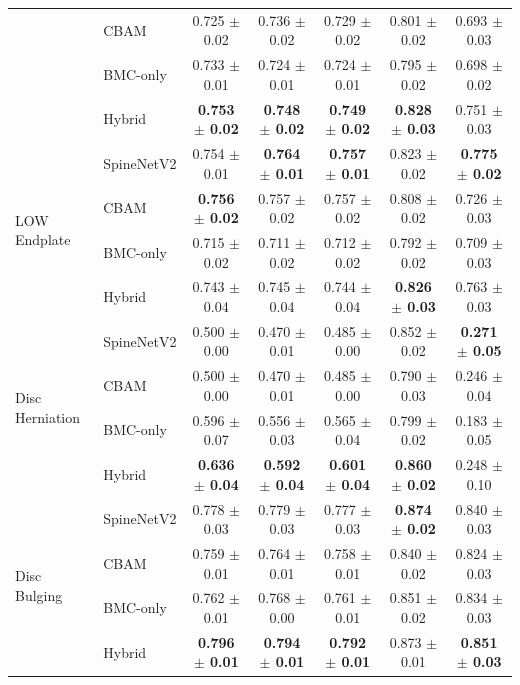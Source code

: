 \begin{table}[htbp]
{\begin{tabular}{llccccc}
 & CBAM     & 0.725 $\pm$ 0.02 & 0.736 $\pm$ 0.02 & 0.729 $\pm$ 0.02 & 0.801 $\pm$ 0.02 & 0.693 $\pm$ 0.03 \\
 & BMC-only & 0.733 $\pm$ 0.01 & 0.724 $\pm$ 0.01 & 0.724 $\pm$ 0.01 & 0.795 $\pm$ 0.02 & 0.698 $\pm$ 0.02 \\
 & Hybrid   & \textbf{0.753 $\pm$ 0.02} & \textbf{0.748 $\pm$ 0.02} & \textbf{0.749 $\pm$ 0.02} & \textbf{0.828 $\pm$ 0.03} & 0.751 $\pm$ 0.03 \\
\midrule
\multirow{4}{*}{LOW Endplate}
 & SpineNetV2 & 0.754 $\pm$ 0.01 & \textbf{0.764 $\pm$ 0.01} & \textbf{0.757 $\pm$ 0.01} & 0.823 $\pm$ 0.02 & \textbf{0.775 $\pm$ 0.02} \\
 & CBAM     & \textbf{0.756 $\pm$ 0.02} & 0.757 $\pm$ 0.02 & 0.757 $\pm$ 0.02 & 0.808 $\pm$ 0.02 & 0.726 $\pm$ 0.03 \\
 & BMC-only & 0.715 $\pm$ 0.02 & 0.711 $\pm$ 0.02 & 0.712 $\pm$ 0.02 & 0.792 $\pm$ 0.02 & 0.709 $\pm$ 0.03 \\
 & Hybrid   & 0.743 $\pm$ 0.04 & 0.745 $\pm$ 0.04 & 0.744 $\pm$ 0.04 & \textbf{0.826 $\pm$ 0.03} & 0.763 $\pm$ 0.03 \\
\midrule
\multirow{4}{*}{Disc Herniation}
 & SpineNetV2 & 0.500 $\pm$ 0.00 & 0.470 $\pm$ 0.01 & 0.485 $\pm$ 0.00 & 0.852 $\pm$ 0.02 & \textbf{0.271 $\pm$ 0.05} \\
 & CBAM     & 0.500 $\pm$ 0.00 & 0.470 $\pm$ 0.01 & 0.485 $\pm$ 0.00 & 0.790 $\pm$ 0.03 & 0.246 $\pm$ 0.04 \\
 & BMC-only & 0.596 $\pm$ 0.07 & 0.556 $\pm$ 0.03 & 0.565 $\pm$ 0.04 & 0.799 $\pm$ 0.02 & 0.183 $\pm$ 0.05 \\
 & Hybrid   & \textbf{0.636 $\pm$ 0.04} & \textbf{0.592 $\pm$ 0.04} & \textbf{0.601 $\pm$ 0.04} & \textbf{0.860 $\pm$ 0.02} & 0.248 $\pm$ 0.10 \\
\midrule
\multirow{4}{*}{Disc Bulging}
 & SpineNetV2 & 0.778 $\pm$ 0.03 & 0.779 $\pm$ 0.03 & 0.777 $\pm$ 0.03 & \textbf{0.874 $\pm$ 0.02} & 0.840 $\pm$ 0.03 \\
 & CBAM     & 0.759 $\pm$ 0.01 & 0.764 $\pm$ 0.01 & 0.758 $\pm$ 0.01 & 0.840 $\pm$ 0.02 & 0.824 $\pm$ 0.03 \\
 
  & BMC-only  & 0.762 $\pm$ 0.01 & 0.768 $\pm$ 0.00 & 0.761 $\pm$ 0.01 & 0.851 $\pm$ 0.02 & 0.834 $\pm$ 0.03 \\
 & Hybrid  & \textbf{0.796 $\pm$ 0.01} & \textbf{0.794 $\pm$ 0.01} & \textbf{0.792 $\pm$ 0.01} & 0.873 $\pm$ 0.01 & \textbf{0.851 $\pm$ 0.03} \\
\bottomrule
\end{tabular}%
}
\end{table}

